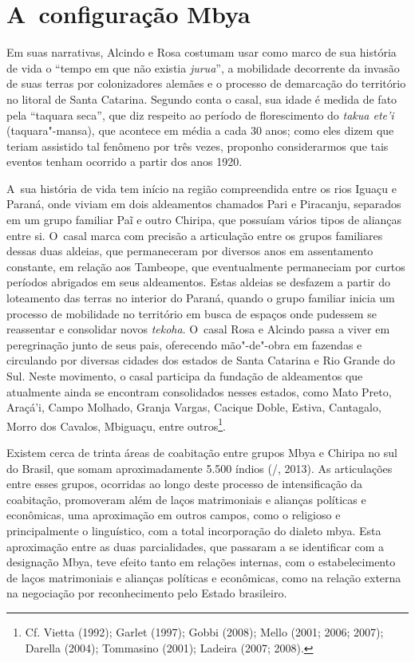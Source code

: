 \section{A~configuração Mbya}

Em suas narrativas, Alcindo e Rosa costumam usar como marco de sua
história de vida o ``tempo em que não existia \emph{jurua}'', a mobilidade
decorrente da invasão de suas terras por colonizadores alemães e o
processo de demarcação do território no litoral de Santa Catarina.
Segundo conta o casal, sua idade é medida de fato pela ``taquara seca'',
que diz respeito ao período de florescimento do \emph{takua ete’i}
(taquara"-mansa), que acontece em média a cada 30 anos; como eles dizem
que teriam assistido tal fenômeno por três vezes, proponho
considerarmos que tais eventos tenham ocorrido a partir dos anos 1920.

A~sua história de vida tem início na região compreendida entre os rios
Iguaçu e Paraná, onde viviam em dois aldeamentos chamados Pari e
Piracanju, separados em um grupo familiar Paĩ e
outro Chiripa, que possuíam vários tipos de alianças entre si. O~casal
marca com precisão a articulação entre os grupos familiares dessas duas
aldeias, que permaneceram por diversos anos em assentamento constante,
em relação aos Tambeope, que eventualmente permaneciam por curtos
períodos abrigados em seus aldeamentos. Estas aldeias se desfazem a
partir do loteamento das terras no interior do Paraná, quando o grupo
familiar inicia um processo de mobilidade no território em busca de
espaços onde pudessem se reassentar e consolidar novos \emph{tekoha}. O~casal
Rosa e Alcindo passa a viver em peregrinação junto de seus pais,
oferecendo mão"-de"-obra em fazendas e circulando por diversas cidades
dos estados de Santa Catarina e Rio Grande do Sul. Neste movimento, o
casal participa da fundação de aldeamentos que atualmente ainda se
encontram consolidados nesses estados, como Mato Preto, Araçá’i, Campo
Molhado, Granja Vargas, Cacique Doble, Estiva, Cantagalo, Morro dos
Cavalos, Mbiguaçu, entre outros\footnote{Cf. Vietta (1992); Garlet
(1997); Gobbi (2008); Mello (2001; 2006; 2007); Darella (2004);
Tommasino (2001); Ladeira (2007; 2008).}.

Existem cerca de trinta áreas de coabitação entre grupos Mbya e Chiripa
no sul do Brasil, que somam aproximadamente 5.500 índios (/,
2013). As articulações entre esses grupos, ocorridas ao longo deste processo
de intensificação da coabitação, promoveram além de laços matrimoniais
e alianças políticas e econômicas, uma aproximação em outros campos,
como o religioso e principalmente o linguístico, com a total
incorporação do dialeto mbya. Esta aproximação entre as duas
parcialidades, que passaram a se identificar com a designação Mbya,
teve efeito tanto em relações internas, com o estabelecimento de laços
matrimoniais e alianças políticas e econômicas, como na relação externa
na negociação por reconhecimento pelo Estado brasileiro.

